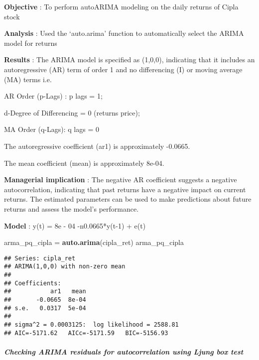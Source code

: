 \documentclass[
]{article}
\newenvironment{Shaded}{\begin{snugshade}}{\end{snugshade}}
\newcommand{\FunctionTok}[1]{\textcolor[rgb]{0.13,0.29,0.53}{\textbf{#1}}}
\newcommand{\NormalTok}[1]{#1}
\newcommand{\OtherTok}[1]{\textcolor[rgb]{0.56,0.35,0.01}{#1}}
\newcommand{\SpecialCharTok}[1]{\textcolor[rgb]{0.81,0.36,0.00}{\textbf{#1}}}
\begin{document}
\textbf{Objective} : To perform autoARIMA modeling on the daily returns
of Cipla stock

\textbf{Analysis} : Used the `auto.arima' function to automatically
select the ARIMA model for returns

\textbf{Results} : The ARIMA model is specified as (1,0,0), indicating
that it includes an autoregressive (AR) term of order 1 and no
differencing (I) or moving average (MA) terms i.e.~

AR Order (p-Lags) : p lags = 1;

d-Degree of Differencing = 0 (returns price);

MA Order (q-Lags): q lags = 0

The autoregressive coefficient (ar1) is approximately -0.0665.

The mean coefficient (mean) is approximately 8e-04.

\textbf{Managerial implication} : The negative AR coefficient suggests a
negative autocorrelation, indicating that past returns have a negative
impact on current returns. The estimated parameters can be used to make
predictions about future returns and assess the model's performance.

\textbf{Model} : y(t) = 8e - 04 -n0.0665*y(t-1) + e(t)

\begin{Shaded}
\begin{Highlighting}[]
\NormalTok{arma\_pq\_cipla }\OtherTok{=} \FunctionTok{auto.arima}\NormalTok{(cipla\_ret) }
\NormalTok{arma\_pq\_cipla}
\end{Highlighting}
\end{Shaded}

\begin{verbatim}
## Series: cipla_ret 
## ARIMA(1,0,0) with non-zero mean 
## 
## Coefficients:
##           ar1   mean
##       -0.0665  8e-04
## s.e.   0.0317  5e-04
## 
## sigma^2 = 0.0003125:  log likelihood = 2588.81
## AIC=-5171.62   AICc=-5171.59   BIC=-5156.93
\end{verbatim}

\hypertarget{checking-arima-residuals-for-autocorrelation-using-ljung-box-test}{%
\subparagraph{\texorpdfstring{\textbf{Checking ARIMA residuals for
autocorrelation using Ljung box
test}}{Checking ARIMA residuals for autocorrelation using Ljung box test}}\label{checking-arima-residuals-for-autocorrelation-using-ljung-box-test}}

\begin{Shaded}
\end{Shaded}
\end{document}
